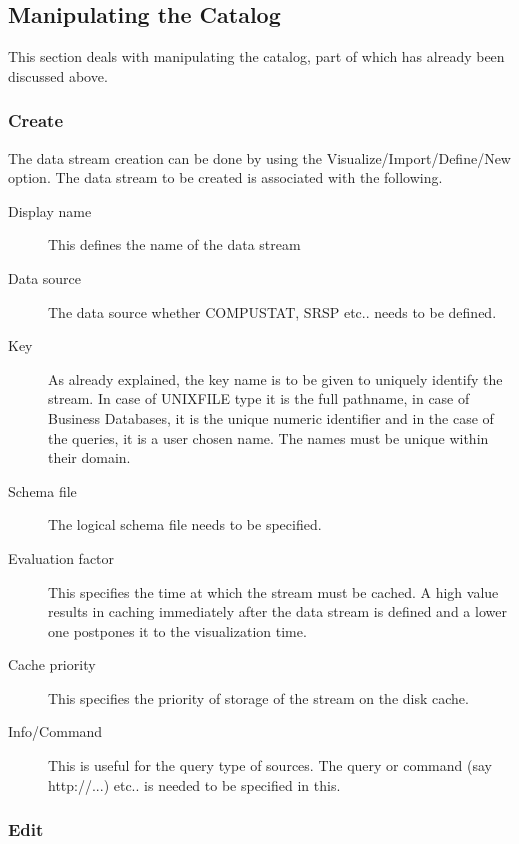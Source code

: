 \subsection{Manipulating the Catalog}

This section deals with manipulating the catalog, part of which has already been discussed above.

\subsubsection{Create}

The data stream creation can be done by using the Visualize/Import/Define/New option.  The data stream to be created is associated with the following.

\begin{description}
\item[Display name] This defines the name of the data stream
\item[Data source] The data source whether COMPUSTAT, SRSP etc.. needs to be defined.
\item[Key] As already explained, the key name is to be given to uniquely identify the stream. In case of UNIXFILE type it is the full pathname, in case of Business Databases, it is the unique numeric identifier and in the case of the queries, it is a user chosen name. The names must be unique within their domain.
\item[Schema file] The logical schema file needs to be specified.
\item[Evaluation factor] This specifies the time at which the stream must be cached. A high value results in caching immediately after the data stream is defined and a lower one postpones it to the visualization time.
\item[Cache priority] This specifies the priority of storage of the stream on the disk cache.
\item[Info/Command] This is useful for the query type of sources. The query or command (say http://...) etc.. is needed to be specified in this.
\end{description}


\subsubsection{Edit}

